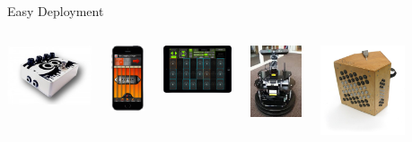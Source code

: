 \begin{frame}[fragile]{Easy Deployment}
    \begin{columns}
        \begin{center}
          \href{file:/Users/yannorlarey/Documents/demo-faust/0-Videos/1-faust-owl-android.mp4}{\includegraphics[width=2.5cm,keepaspectratio=true]{images/owl.jpg}}
        \end{center}

        \begin{center}
          \href{file:/Users/yannorlarey/Documents/demo-faust/0-Videos/5.1-MoForte-PowerChord.mp4}{\includegraphics[width=1cm,keepaspectratio=true]{images/moforte.png}}
        \end{center}

        \begin{center}
          \href{file:/Users/yannorlarey/Documents/demo-faust/0-Videos/5.2-Geo-Shred.mp4}{\includegraphics[width=2cm,keepaspectratio=true]{images/GeoShred}}
        \end{center}

        \begin{center}
            \href{file:/Users/yannorlarey/Documents/demo-faust/0-Videos/2-faust-ros.mp4}{\includegraphics[width=1.5cm,keepaspectratio=true]{images/emoxone}}
          \end{center}

        \begin{center}
          \href{file:/Users/yannorlarey/Documents/demo-faust/0-Videos/3-Striso.mp4}{\includegraphics[width=2.5cm,keepaspectratio=true]{images/striso.jpg}}
        \end{center}


\end{columns}
\end{frame}
